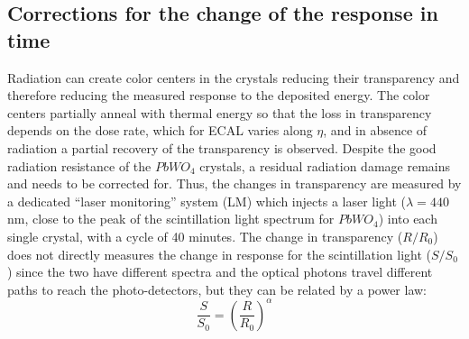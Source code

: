 \documentclass[journal]{IEEEtran}
\begin{document}
\subsection{Corrections for the change of the response in time}
Radiation can create color centers in the crystals reducing their transparency and therefore reducing the measured response to the deposited energy. The color centers partially anneal with thermal energy so that the loss in transparency depends on the dose rate, which for ECAL varies along $\eta$, and in absence of radiation a partial recovery of the transparency is observed.
Despite the good radiation resistance of the $PbWO_4$ crystals, a residual radiation damage remains and needs to be corrected for. Thus, the changes in transparency are measured by a dedicated ``laser monitoring'' system \cite{Anfreville:2007zz} (LM) which injects a laser light ($\lambda=440$ nm, close to the peak of the scintillation light spectrum for $PbWO_4$) into each single crystal, with a cycle of 40 minutes. The change in transparency ($R/R_0$) does not directly measures the change in response for the scintillation light ($S/S_0$) since the two have different spectra and the optical photons travel different paths to reach the photo-detectors, but they can be related by a power law:
\begin{equation}
\frac{S}{S_0} = \left(\frac{R}{R_0}\right)^\alpha
\end{equation}
\end{document}
